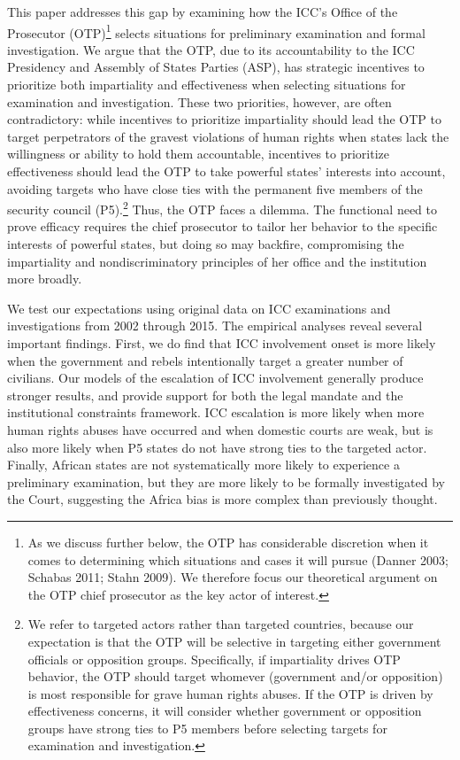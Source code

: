 This paper addresses this gap by examining how the ICC's Office of the Prosecutor (OTP)\footnote{As we discuss further below, the OTP has considerable discretion when it comes to determining which situations and cases it will pursue (Danner 2003; Schabas 2011; Stahn 2009). We therefore focus our theoretical argument on the OTP chief prosecutor as the key actor of interest.} selects situations for preliminary examination and formal investigation. We argue that the OTP, due to its accountability to the ICC Presidency and Assembly of States Parties (ASP), has strategic incentives to prioritize both impartiality and effectiveness when selecting situations for examination and investigation. These two priorities, however, are often contradictory: while incentives to prioritize impartiality should lead the OTP to target perpetrators of the gravest violations of human rights when states lack the willingness or ability to hold them accountable, incentives to prioritize effectiveness should lead the OTP to take powerful states' interests into account, avoiding targets who have close ties with the permanent five members of the security council (P5).\footnote{We refer to targeted actors rather than targeted countries, because our expectation is that the OTP will be selective in targeting either government officials or opposition groups. Specifically, if impartiality drives OTP behavior, the OTP should target whomever (government and/or opposition) is most responsible for grave human rights abuses. If the OTP is driven by effectiveness concerns, it will consider whether government or opposition groups have strong ties to P5 members before selecting targets for examination and investigation.} Thus, the OTP faces a dilemma. The functional need to prove efficacy requires the chief prosecutor to tailor her behavior to the specific interests of powerful states, but doing so may backfire, compromising the impartiality and nondiscriminatory principles of her office and the institution more broadly.

We test our expectations using original data on ICC examinations and investigations from 2002 through 2015. The empirical analyses reveal several important findings. First, we do find that ICC involvement onset is more likely when the government and rebels intentionally target a greater number of civilians. Our models of the escalation of ICC involvement generally produce stronger results, and provide support for both the legal mandate and the institutional constraints framework. ICC escalation is more likely when more human rights abuses have occurred and when domestic courts are weak, but is also more likely when P5 states do not have strong ties to the targeted actor. Finally, African states are not systematically more likely to experience a preliminary examination, but they are more likely to be formally investigated by the Court, suggesting the Africa bias is more complex than previously thought.

